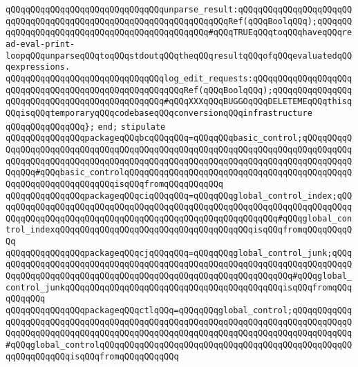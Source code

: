 \newline
\verb|qQQqqQQqqQQqqQQqqQQqqQQqqQQqqQQqunparse_result:qQQqqQQqqQQqqQQqqQQqqQQqqQQqqQQqqQQqqQQqqQQqqQQqqQQqqQQqqQQqqQQqqQQqRef(qQQqBoolqQQq);qQQqqQQqqQQqqQQqqQQqqQQqqQQqqQQqqQQqqQQqqQQqqQQq#qQQqTRUEqQQqtoqQQqhaveqQQqread-eval-print-loopqQQqunparseqQQqtoqQQqstdoutqQQqtheqQQqresultqQQqofqQQqevaluatedqQQqexpressions.|\newline
\verb|qQQqqQQqqQQqqQQqqQQqqQQqqQQqqQQqlog_edit_requests:qQQqqQQqqQQqqQQqqQQqqQQqqQQqqQQqqQQqqQQqqQQqqQQqqQQqqQQqRef(qQQqBoolqQQq);qQQqqQQqqQQqqQQqqQQqqQQqqQQqqQQqqQQqqQQqqQQqqQQq#qQQqXXXqQQqBUGGOqQQqDELETEMEqQQqthisqQQqisqQQqtemporaryqQQqcodebaseqQQqconversionqQQqinfrastructure|\newline
\newline
\verb|qQQqqQQqqQQqqQQq};|\newline
\verb|end;|\newline
\newline
\newline
\verb|stipulate|\newline
\verb|qQQqqQQqqQQqqQQqpackageqQQqbcqQQqqQQq=qQQqqQQqbasic_control;qQQqqQQqqQQqqQQqqQQqqQQqqQQqqQQqqQQqqQQqqQQqqQQqqQQqqQQqqQQqqQQqqQQqqQQqqQQqqQQqqQQqqQQqqQQqqQQqqQQqqQQqqQQqqQQqqQQqqQQqqQQqqQQqqQQqqQQqqQQqqQQqqQQqqQQqqQQq#qQQqbasic_controlqQQqqQQqqQQqqQQqqQQqqQQqqQQqqQQqqQQqqQQqqQQqqQQqqQQqqQQqqQQqqQQqqQQqisqQQqfromqQQqqQQqqQQq|\newline
\verb|qQQqqQQqqQQqqQQqpackageqQQqciqQQqqQQq=qQQqqQQqglobal_control_index;qQQqqQQqqQQqqQQqqQQqqQQqqQQqqQQqqQQqqQQqqQQqqQQqqQQqqQQqqQQqqQQqqQQqqQQqqQQqqQQqqQQqqQQqqQQqqQQqqQQqqQQqqQQqqQQqqQQqqQQqqQQqqQQq#qQQqglobal_control_indexqQQqqQQqqQQqqQQqqQQqqQQqqQQqqQQqqQQqqQQqisqQQqfromqQQqqQQqqQQq|\newline
\verb|qQQqqQQqqQQqqQQqpackageqQQqcjqQQqqQQq=qQQqqQQqglobal_control_junk;qQQqqQQqqQQqqQQqqQQqqQQqqQQqqQQqqQQqqQQqqQQqqQQqqQQqqQQqqQQqqQQqqQQqqQQqqQQqqQQqqQQqqQQqqQQqqQQqqQQqqQQqqQQqqQQqqQQqqQQqqQQqqQQqqQQq#qQQqglobal_control_junkqQQqqQQqqQQqqQQqqQQqqQQqqQQqqQQqqQQqqQQqqQQqisqQQqfromqQQqqQQqqQQq|\newline
\verb|qQQqqQQqqQQqqQQqpackageqQQqctlqQQq=qQQqqQQqglobal_control;qQQqqQQqqQQqqQQqqQQqqQQqqQQqqQQqqQQqqQQqqQQqqQQqqQQqqQQqqQQqqQQqqQQqqQQqqQQqqQQqqQQqqQQqqQQqqQQqqQQqqQQqqQQqqQQqqQQqqQQqqQQqqQQqqQQqqQQqqQQqqQQqqQQqqQQq#qQQqglobal_controlqQQqqQQqqQQqqQQqqQQqqQQqqQQqqQQqqQQqqQQqqQQqqQQqqQQqqQQqqQQqqQQqisqQQqfromqQQqqQQqqQQq|\newline
